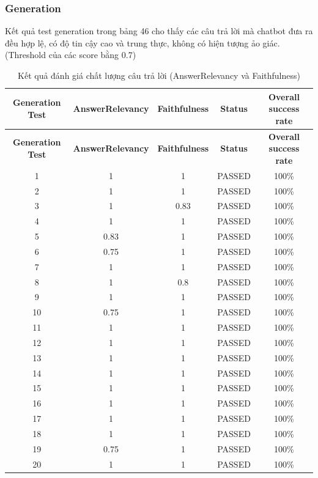 \subsubsection{Generation}
Kết quả test generation trong bảng 46 cho thấy các câu trả lời mà chatbot đưa ra đều hợp lệ, có độ tin cậy cao và trung thực, không có hiện tượng ảo giác. (Threshold của các score bằng 0.7)

\begin{longtable}{|c|c|c|c|c|}
	\caption{Kết quả đánh giá chất lượng câu trả lời (AnswerRelevancy và Faithfulness)} \\
	\hline
	\textbf{Generation Test} & \textbf{AnswerRelevancy} & \textbf{Faithfulness} & \textbf{Status} & \textbf{Overall success rate} \\
	\hline
	\endfirsthead
	
	\hline
	\textbf{Generation Test} & \textbf{AnswerRelevancy} & \textbf{Faithfulness} & \textbf{Status} & \textbf{Overall success rate} \\
	\hline
	\endhead
	
	\hline
	\endfoot
	
	\hline
	\endlastfoot
	
	1  & 1    & 1    & PASSED & 100\% \\
	2  & 1    & 1    & PASSED & 100\% \\
	3  & 1    & 0.83 & PASSED & 100\% \\
	4  & 1    & 1    & PASSED & 100\% \\
	5  & 0.83 & 1    & PASSED & 100\% \\
	6  & 0.75 & 1    & PASSED & 100\% \\
	7  & 1    & 1    & PASSED & 100\% \\
	8  & 1    & 0.8  & PASSED & 100\% \\
	9  & 1    & 1    & PASSED & 100\% \\
	10 & 0.75 & 1    & PASSED & 100\% \\
	11 & 1    & 1    & PASSED & 100\% \\
	12 & 1    & 1    & PASSED & 100\% \\
	13 & 1    & 1    & PASSED & 100\% \\
	14 & 1    & 1    & PASSED & 100\% \\
	15 & 1    & 1    & PASSED & 100\% \\
	16 & 1    & 1    & PASSED & 100\% \\
	17 & 1    & 1    & PASSED & 100\% \\
	18 & 1    & 1    & PASSED & 100\% \\
	19 & 0.75 & 1    & PASSED & 100\% \\
	20 & 1    & 1    & PASSED & 100\% \\
	
\end{longtable}
